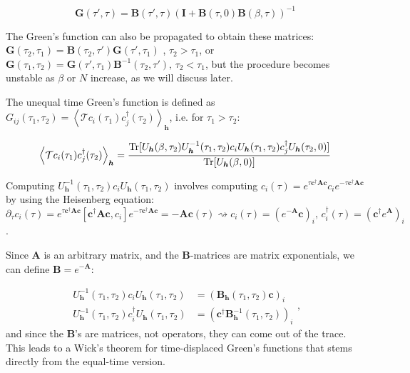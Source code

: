 \begin{equation}
\bm G ( \tau' , \tau ) = \bm B ( \tau', \tau ) ( \bm I + \bm B ( \tau, 0 ) \bm B ( \beta, \tau ) )^{-1}
\end{equation}

The Green's function can also be propagated to obtain these matrices: $\bm G ( \tau_2, \tau_1) = \bm B ( \tau_2, \tau') \bm G ( \tau', \tau_1)$ , $\tau_2 > \tau_1$, or $\bm G ( \tau_1, \tau_2) =  \bm G ( \tau', \tau_1) \bm B^{-1} ( \tau_2, \tau') , \, \tau_2 < \tau_1$, but the procedure becomes unstable as $\beta$ or $N$ increase, as we will discuss later.

The unequal time Green's function is defined as 
$
G_{ij} ( \tau_1, \tau_2 ) = \left\langle \mathcal{T} c_i ( \tau_1 ) c_j^\dagger ( \tau_2 ) \right\rangle_{\bm h}
$, 
i.e. for $\tau_1 > \tau_2$:

\begin{equation}
\left\langle \mathcal{T} c_i ( \tau_1 ) c_j^\dagger ( \tau_2 ) \right\rangle_{\bm h} = \frac{\operatorname{Tr} [ U_{\bm h} (\beta, \tau_2 ) U_{\bm h}^{-1} (\tau_1, \tau_2) c_i U_{\bm h} (\tau_1, \tau_2 ) c_j^\dagger U_{\bm h} (\tau_2, 0) ]}{\operatorname{Tr}[ U_{\bm h}(\beta, 0) ]}
\end{equation}

Computing $U_{\bm h}^{-1} (\tau_1, \tau_2) c_i U_{\bm h} (\tau_1, \tau_2 )$ involves computing $c_i ( \tau ) = e^{\tau \bm c^\dagger \bm A \bm c} c_i e^{-\tau \bm c^\dagger \bm A \bm c}$ by using the Heisenberg equation:
$
\partial_\tau c_i ( \tau ) = e^{\tau \bm c^\dagger \bm A \bm c} [ \bm c^\dagger \bm A \bm c, c_i ] e^{-\tau \bm c^\dagger \bm A \bm c} = - \bm A \bm c ( \tau ) \rightsquigarrow c_i (\tau ) = ( e^{-\bm A} \bm c )_i , \, c_i ^\dagger(\tau ) = ( \bm c^\dagger e^{\bm A}  )_i 
$.

Since $\bm A$ is an arbitrary matrix, and the $\bm B$-matrices are matrix exponentials, we can define $\bm B = e^{-\bm A}$:

\begin{equation}
\begin{split}
U_{\bm h}^{-1} (\tau_1, \tau_2) c_i U_{\bm h} (\tau_1, \tau_2 ) &= ( \bm B_{\bm h} ( \tau_1 , \tau_2 ) \bm c )_i \\
U_{\bm h}^{-1} (\tau_1, \tau_2) c_i^\dagger U_{\bm h} (\tau_1, \tau_2 ) &= ( \bm c^\dagger \bm B_{\bm h}^{-1} ( \tau_1 , \tau_2 )  )_i
\end{split} ,
\end{equation}
and since the $\bm B$'s are matrices, not operators, they can come out of the trace.
This leads to a Wick's theorem for time-displaced Green's functions that stems directly from the equal-time version.


